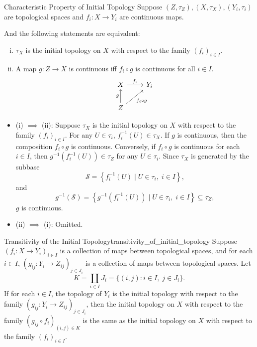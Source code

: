 \documentclass{report}
\begin{document}
\begin{proposition}{Characteristic Property of Initial Topology}{}
	Suppose $(Z,\tau_Z), (X,\tau_X),(Y_i,\tau_i)$ are topological spaces and $f_i: X \to Y_i$ are continuous maps. 
	
	And the following statements are equivalent:
	\begin{enumerate}[(i)]
		\item $\tau_X$ is the initial topology on $X$ with respect to the family $\left(f_i\right)_{i \in I}$.
		\item A map $g:Z\to X$ is continuous iff $f_i\circ g$ is continuous for all $i \in I$. 
		\[
			\begin{tikzcd}
				X \arrow[r, "f_i"]                         & Y_i \\
				Z \arrow[u, "g"] \arrow[ru, "f_i\circ g"'] &    
			\end{tikzcd}
		\]
	\end{enumerate}
\end{proposition}

\begin{prf}
	\phantom{.} 
	\begin{itemize}[leftmargin=*]
		\item (i) $\implies$ (ii): Suppose $\tau_X$ is the initial topology on $X$ with respect to the family $\left(f_i\right)_{i \in I}$. For any $U\in \tau_i$, $f_i^{-1}(U)\in \tau_X$. If $g$ is continuous, then the composition $f_i\circ g$ is continuous. Conversely, if $f_i\circ g$ is continuous for each $i \in I$, then $g^{-1}(f_i^{-1}(U))\in \tau_Z$ for any $U\in \tau_i$. Since $\tau_X$ is generated by the subbase
		\[
		\mathcal{S}=\left\{ f_i^{-1}(U) \mid U\in \tau_i, \;i \in I \right\},
		\]
		and 
		\[
		g^{-1}\left(\mathcal{S}\right)=\left\{ g^{-1}(f_i^{-1}(U)) \mid U\in \tau_i, \;i \in I \right\} \subseteq \tau_Z,
		\]
		$g$ is continuous.
		\item (ii) $\implies$ (i): Omitted.
	\end{itemize}
\end{prf}

\begin{proposition}{Transitivity of the Initial Topology}{transitivity_of_initial_topology}
	Suppose $\left(f_i: X \to Y_i\right)_{i \in I}$ is a collection of maps between topological spaces, and for each $i\in I$, $\left(g_{ij}: Y_i \to Z_{ij}\right)_{j\in J_i}$ is a collection of maps between topological spaces. Let
	\[
		K = \coprod_{i\in I} J_i = \{ (i,j) : i\in I,\; j\in J_i \}.
	\]
	If for each $i\in I$, the topology of $Y_i$ is the initial topology with respect to the family $\left(g_{ij}: Y_i \to Z_{ij}\right)_{j\in J_i}$, then the initial topology on $X$ with respect to the family $\left(g_{ij}\circ f_i\right)_{(i,j)\in K}$ is the same as the initial topology on $X$ with respect to the family $\left(f_i\right)_{i \in I}$.
\end{proposition}
\end{document}
